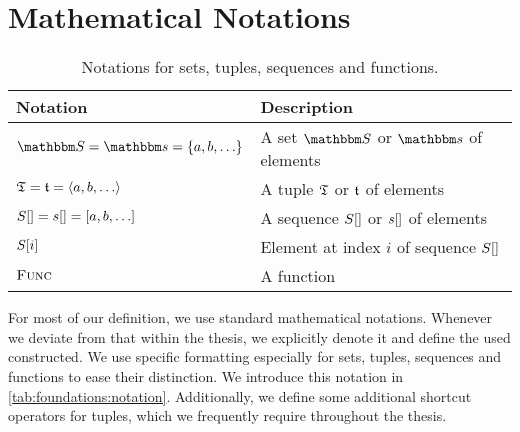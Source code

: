 \section{Mathematical Notations}
\label{chap:foundations:notations}

\begin{table}
    \centering
    \small
    \renewcommand{\arraystretch}{1.4}%
    \begin{tabular}{L{10em} L{17em}}
        \toprule
        \textbf{Notation} & \textbf{Description} \\
        \midrule
        $\set{S} = \set{s} = \setted{a, b, \ldots}$ 
            & A set $\set{S}$ or $\set{s}$ of elements\\
        $\mathfrak{T} = \mathfrak{t} = \langle a, b, \ldots \rangle$ 
            & A tuple $\mathfrak{T}$ or $\mathfrak{t}$ of elements\\
        $S[] = s[] = [a, b, \ldots]$ 
            & A sequence $S[]$ or $s[]$ of elements\\
        $S[i]$ 
            & Element at index $i$ of sequence $S[]$\\
        $\textsc{Func}$ 
            & A function\\
        \bottomrule
    \end{tabular}
    \caption[Notations for sets, tuples, sequences and functions]{Notations for sets, tuples, sequences and functions.}
    \label{tab:foundations:notation}
\end{table}

For most of our definition, we use standard mathematical notations.
Whenever we deviate from that within the thesis, we explicitly denote it and define the used constructed.
We use specific formatting especially for sets, tuples, sequences and functions to ease their distinction.
We introduce this notation in \autoref{tab:foundations:notation}.
Additionally, we define some additional shortcut operators for tuples, which we frequently require throughout the thesis.

